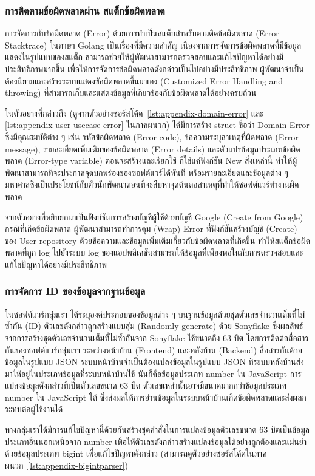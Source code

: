 \documentclass[12pt,one side,openright,a4paper]{cpe-thesis-th}
\newcommand{\thaijustify}[1]{%
  \par\hspace{30pt}\justifying
  #1
}
\begin{document}
        \subsubsection{การติดตามข้อผิดพลาดผ่าน สแต็กข้อผิดพลาด}
            \thaijustify{
                การจัดการกับข้อผิดพลาด (Error) ด้วยการทำเป็นสแต็กสำหรับตามติดข้อผิดพลาด (Error Stacktrace) ในภาษา Golang เป็นเรื่องที่มีความสำคัญ เนื่องจากการจัดการข้อผิดพลาดที่มีข้อมูลแสดงในรูปแบบของสแต็ก สามารถช่วยให้ผู้พัฒนาสามารถตรวจสอบและแก้ไขปัญหาได้อย่างมีประสิทธิภาพมากขึ้น เพื่อให้การจัดการข้อผิดพลาดดังกล่าวเป็นไปอย่างมีประสิทธิภาพ ผู้พัฒนาจำเป็นต้องนิยามและสร้างระบบแสดงขัอผิดพลาดขึ้นมาเอง (Customized Error Handling and throwing) ที่สามารถเก็บและแสดงข้อมูลที่เกี่ยวข้องกับข้อผิดพลาดได้อย่างครบถ้วน
            }
            \thaijustify{
                ในตัวอย่างที่กล่าวถึง (ดูจากตัวอย่างซอร์สโค้ด~\ref{lst:appendix-domain-error} และ \ref{lst:appendix-user-usecase-error} ในภาคผนวก) ได้มีการสร้าง struct ชื่อว่า Domain Error ซึ่งมีคุณสมบัติต่าง ๆ เช่น รหัสข้อผิดพลาด (Error code), ข้อความระบุสาเหตุที่ผิดพลาด (Error message), รายละเอียดเพิ่มเติมของข้อผิดพลาด (Error details) และตัวแปรข้อมูลประเภทข้อผิดพลาด (Error-type variable) ตอนจะสร้างและเรียกใช้ ก็ใช้แค่ฟังก์ชัน New สิ่งเหล่านี้ ทำให้ผู้พัฒนาสามารถที่จะประกาศจุดบกพร่องของซอฟต์แวร์ได้ทันที พร้อมรายละเอียดและข้อมูลต่าง ๆ มหาศาลซึ่งเป็นประโยชน์กับตัวนักพัฒนาตอนที่จะสืบหาจุดต้นตอสาเหตุที่ทำให้ซอฟต์แวร์ทำงานผิดพลาด
            }
            \thaijustify{
                จากตัวอย่างที่หยิบยกมาเป็นฟังก์ชันการสร้างบัญชีผู้ใช้ด้วยบัญชี Google (Create from Google) กรณีที่เกิดข้อผิดพลาด ผู้พัฒนาสามารถทำการคุม (Wrap) Error ที่ฟังก์ชันสร้างบัญชี (Create) ของ User repository ด้วยข้อความและข้อมูลเพิ่มเติมเกี่ยวกับข้อผิดพลาดที่เกิดขึ้น ทำให้สแต็กข้อผิดพลาดที่ถูก log ไปยังระบบ log ของแอปพลิเคชันสามารถให้ข้อมูลที่เพียงพอในกับการตรวจสอบและแก้ไขปัญหาได้อย่างมีประสิทธิภาพ 
            }
        \subsubsection{การจัดการ ID ของข้อมูลจากฐานข้อมูล}
            \thaijustify{
                ในซอฟต์แวร์กลุ่มเรา ได้ระบุองค์ประกอบของข้อมูลต่าง ๆ บนฐานข้อมูลด้วยชุดตัวเลขจำนวนเต็มที่ไม่ซ้ำกัน (ID) ตัวเลขดังกล่าวถูกสร้างแบบสุ่ม (Randomly generate) ด้วย Sonyflake ซึ่งผลลัพธ์จากการสร้างชุดตัวเลขจำนวนเต็มที่ไม่ซ้ำกันจาก Sonyflake ใช้ขนาดถึง 63 บิต โดยการติดต่อสื่อสารกันของซอฟต์แวร์กลุ่มเรา ระหว่างหน้าบ้าน (Frontend) และหลังบ้าน (Backend) สื่อสารกันด้วยข้อมูลในรูปแบบ JSON ระบบหน้าบ้านจำเป็นต้องแปลงข้อมูลในรูปแบบ JSON ที่ระบบหลังบ้านส่งมาให้อยู่ในประเภทข้อมูลที่ระบบหน้าบ้านใช้ นั่นก็คือข้อมูลประเภท number ใน JavaScript การแปลงข้อมูลดังกล่าวที่เป็นตัวเลขขนาด 63 บิต ตัวเลขเหล่านั้นอาจมีขนาดมากกว่าข้อมูลประเภท number ใน JavaScript ได้ ซึ่งส่งผลให้การอ่านข้อมูลในระบบหน้าบ้านเกิดข้อผิดพลาดและส่งผลกระทบต่อผู้ใช้งานได้
            }
            \thaijustify{
                ทางกลุ่มเราได้มีการแก้ไขปัญหานี้ด้วยกันสร้างชุดคำสั่งในการแปลงข้อมูลตัวเลขขนาด 63 บิตเป็นข้อมูลประเภทอื่นนอกเหนือจาก number เพื่อให้ตัวเลขดังกล่าวสร้างแปลงข้อมูลได้อย่างถูกต้องและแม่นยำ ด้วยข้อมูลประเภท bigint เพื่อแก้ไขปัญหาดังกล่าว (สามารถดูตัวอย่างซอร์สโค้ดในภาคผนวก~\ref{lst:appendix-bigintparser})
            }
\end{document}
